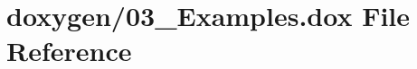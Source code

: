 \hypertarget{03__Examples_8dox}{\section{doxygen/03\+\_\+\+Examples.dox File Reference}
\label{03__Examples_8dox}
}
